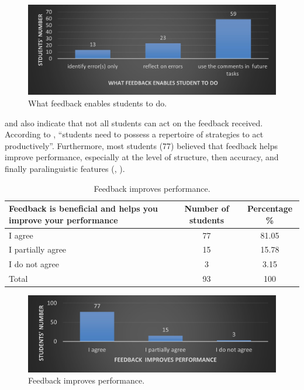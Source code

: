 \documentclass[english]{textolivre}
\begin{document}
\begin{figure}[h!]
 \centering
 \begin{minipage}{.85\textwidth}
 \includegraphics[width=\textwidth]{06.jpg}
 \caption{What feedback enables students to do.}
 \label{fig06}
 \end{minipage}
\end{figure}


 and  also indicate that not all students can act on the feedback received. According to \textcite[p. 1318]{carless_development_2018}, “students need to possess a repertoire of strategies to act productively”. Furthermore, most students (77) believed that feedback helps improve performance, especially at the level of structure, then accuracy, and finally paralinguistic features (, ).

\begin{table}[h!]
\centering
\begin{threeparttable}
\caption{Feedback improves performance.}
\label{tbl7}
\centering
\begin{tabular}{p{} c c}
\toprule
Feedback is beneficial and helps you improve your performance & Number of students & Percentage \% \\ \midrule
I agree & 77 & 81.05 \\
I partially agree & 15 & 15.78 \\
I do not agree & 3 & 3.15 \\
Total & 93 & 100 \\
\bottomrule
\end{tabular}
\end{threeparttable}
\end{table}

\begin{figure}[h!]
 \centering
 \begin{minipage}{.85\textwidth}
 \includegraphics[width=\textwidth]{07.jpg}
 \caption{Feedback improves performance.}
 \label{fig07}
 \end{minipage}
\end{figure}
\end{document}
